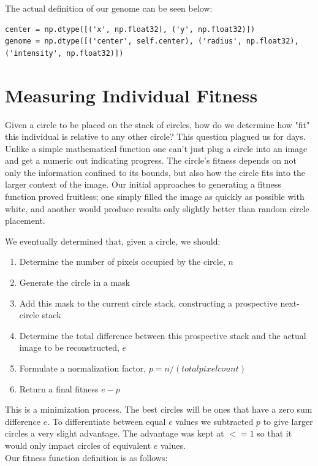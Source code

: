\documentclass[12pt]{article}
\begin{document}
The actual definition of our genome can be seen below:
\begin{verbatim}
center = np.dtype([('x', np.float32), ('y', np.float32)])
genome = np.dtype([('center', self.center), ('radius', np.float32), ('intensity', np.float32)])
\end{verbatim}


\section*{Measuring Individual Fitness}
Given a circle to be placed on the stack of circles, how do we determine how "fit" this individual is relative to any other circle? This question plagued us for days. Unlike a simple mathematical function one can't just plug a circle into an image and get a numeric out indicating progress. The circle's fitness depends on not only the information confined to its bounds, but also how the circle fits into the larger context of the image. Our initial approaches to generating a fitness function proved fruitless; one simply filled the image as quickly as possible with white, and another would produce results only slightly better than random circle placement. 

We eventually determined that, given a circle, we should:
\begin{enumerate}
\item Determine the number of pixels occupied by the circle, $n$
\item Generate the circle in a mask
\item Add this mask to the current circle stack, constructing  a prospective next-circle stack
\item Determine the total difference between this prospective stack and the actual image to be reconstructed, $e$
\item Formulate a normalization factor, $p = n/(total pixel count)$
\item Return a final fitness $e - p$
\end{enumerate}

This is a minimization process. The best circles will be ones that have a zero sum difference $e$. To differentiate between equal $e$ values we subtracted $p$ to give larger circles a very slight advantage. The advantage was kept at $<= 1$ so that it would only impact circles of equivalent $e$ values.
\\

Our fitness function definition is as follows:
\end{document}
